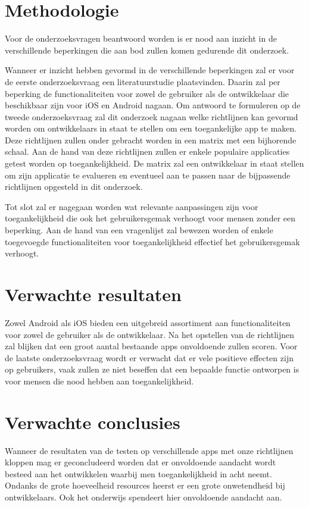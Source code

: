\section{Methodologie}
\label{sec:methodologie}

Voor de onderzoeksvragen beantwoord worden is er nood aan inzicht in de verschillende beperkingen die aan bod zullen komen gedurende dit onderzoek. 

Wanneer er inzicht hebben gevormd in de verschillende beperkingen zal er voor de eerste onderzoeksvraag een literatuurstudie plaatsvinden. Daarin zal per beperking de functionaliteiten voor zowel de gebruiker als de ontwikkelaar die beschikbaar zijn voor iOS en Android nagaan. Om antwoord te formuleren op de tweede onderzoeksvraag zal dit onderzoek nagaan welke richtlijnen kan gevormd worden om ontwikkelaars in staat te stellen om een toegankelijke app te maken. Deze richtlijnen zullen onder gebracht worden in een matrix met een bijhorende schaal. 
Aan de hand van deze richtlijnen zullen er enkele populaire applicaties getest worden op toegankelijkheid. De matrix zal een ontwikkelaar in staat stellen om zijn applicatie te evalueren en eventueel aan te passen naar de bijpassende richtlijnen opgesteld in dit onderzoek. 

Tot slot zal er nagegaan worden wat relevante aanpassingen zijn voor toegankelijkheid die ook het gebruikersgemak verhoogt voor mensen zonder een beperking. Aan de hand van een vragenlijst zal bewezen worden of enkele toegevoegde functionaliteiten voor toegankelijkheid effectief het gebruikersgemak verhoogt.


\section{Verwachte resultaten}
\label{sec:verwachte_resultaten}

 Zowel Android als iOS bieden een uitgebreid assortiment aan functionaliteiten voor zowel de gebruiker als de ontwikkelaar. Na het opstellen van de richtlijnen zal blijken dat een groot aantal bestaande apps onvoldoende zullen scoren. Voor de laatste onderzoeksvraag wordt er verwacht dat er vele positieve effecten zijn op gebruikers, vaak zullen ze niet beseffen dat een bepaalde functie ontworpen is voor mensen die nood hebben aan toegankelijkheid.

\section{Verwachte conclusies}
\label{sec:verwachte_conclusies}

Wanneer de resultaten van de testen op verschillende apps met onze richtlijnen kloppen mag er geconcludeerd worden dat er onvoldoende aandacht wordt besteed aan het ontwikkelen waarbij men toegankelijkheid in acht neemt. Ondanks de grote hoeveelheid resources heerst er een grote onwetendheid bij ontwikkelaars. Ook het onderwijs spendeert hier onvoldoende aandacht aan.
